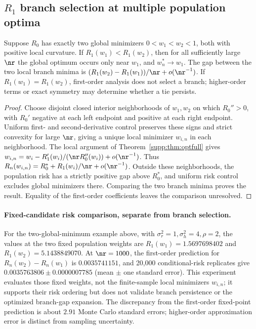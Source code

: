 \subsection{$R_1$ branch selection at multiple population optima}

\begin{proposition}\label{supp:prop:branch-select}
Suppose $R_0$ has exactly two global minimizers $0<w_1<w_2<1$, both with positive local curvature. If $R_1(w_1)<R_1(w_2)$, then for all sufficiently large $\nr$ the global optimum occurs only near $w_1$, and $w_n^*\to w_1$. The gap between the two local branch minima is $(R_1(w_2)-R_1(w_1))/\nr+o(\nr^{-1})$. If $R_1(w_1)=R_1(w_2)$, first-order analysis does not select a branch; higher-order terms or exact symmetry may determine whether a tie persists.
\end{proposition}

\begin{proof}
Choose disjoint closed interior neighborhoods of $w_1,w_2$ on which $R_0''>0$, with $R_0'$ negative at each left endpoint and positive at each right endpoint. Uniform first- and second-derivative control preserves these signs and strict convexity for large $\nr$, giving a unique local minimizer $w_{i,n}$ in each neighborhood. The local argument of Theorem~\ref{supp:thm:optfull} gives $w_{i,n}=w_i-R_1'(w_i)/(\nr R_0''(w_i))+o(\nr^{-1})$. Thus $R_n(w_{i,n})=R_0^*+R_1(w_i)/\nr+o(\nr^{-1})$. Outside these neighborhoods, the population risk has a strictly positive gap above $R_0^*$, and uniform risk control excludes global minimizers there. Comparing the two branch minima proves the result. Equality of the first-order coefficients leaves the comparison unresolved.
\end{proof}

\paragraph{Fixed-candidate risk comparison, separate from branch selection.}
For the two-global-minimum example above, with $\sigma_r^2=1,\sigma_h^2=4,\rho=2$, the values at the two fixed population weights are $R_1(w_1)=1.5697698402$ and $R_1(w_2)=5.1438849070$. At $\nr=1000$, the first-order prediction for $R_n(w_2)-R_n(w_1)$ is $0.0035741151$, and 20{,}000 conditional-risk replicates give $0.0035763806\pm0.0000007785$ (mean $\pm$ one standard error). This experiment evaluates those fixed weights, not the finite-sample local minimizers $w_{i,n}$; it supports their risk ordering but does not validate branch persistence or the optimized branch-gap expansion. The discrepancy from the first-order fixed-point prediction is about $2.91$ Monte Carlo standard errors; higher-order approximation error is distinct from sampling uncertainty.

